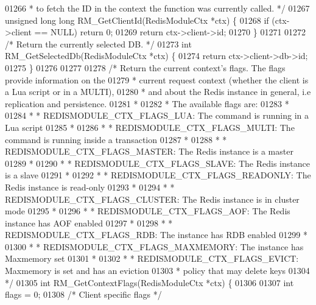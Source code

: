 \begin{DoxyCode}
{{{01266 \textcolor{comment}{ * to fetch the ID in the context the function was currently called. */}
01267 \textcolor{keywordtype}{unsigned} \textcolor{keywordtype}{long} \textcolor{keywordtype}{long} RM\_GetClientId(RedisModuleCtx *ctx) \{
01268     \textcolor{keywordflow}{if} (ctx->client == NULL) \textcolor{keywordflow}{return} 0;
01269     \textcolor{keywordflow}{return} ctx->client->id;
01270 \}
01271 
01272 \textcolor{comment}{/* Return the currently selected DB. */}
01273 \textcolor{keywordtype}{int} RM\_GetSelectedDb(RedisModuleCtx *ctx) \{
01274     \textcolor{keywordflow}{return} ctx->client->db->id;
01275 \}
01276 
01277 
01278 \textcolor{comment}{/* Return the current context's flags. The flags provide information on the }
01279 \textcolor{comment}{ * current request context (whether the client is a Lua script or in a MULTI),}
01280 \textcolor{comment}{ * and about the Redis instance in general, i.e replication and persistence. }
01281 \textcolor{comment}{ * }
01282 \textcolor{comment}{ * The available flags are:}
01283 \textcolor{comment}{ * }
01284 \textcolor{comment}{ *  * REDISMODULE\_CTX\_FLAGS\_LUA: The command is running in a Lua script}
01285 \textcolor{comment}{ * }
01286 \textcolor{comment}{ *  * REDISMODULE\_CTX\_FLAGS\_MULTI: The command is running inside a transaction}
01287 \textcolor{comment}{ * }
01288 \textcolor{comment}{ *  * REDISMODULE\_CTX\_FLAGS\_MASTER: The Redis instance is a master}
01289 \textcolor{comment}{ * }
01290 \textcolor{comment}{ *  * REDISMODULE\_CTX\_FLAGS\_SLAVE: The Redis instance is a slave}
01291 \textcolor{comment}{ * }
01292 \textcolor{comment}{ *  * REDISMODULE\_CTX\_FLAGS\_READONLY: The Redis instance is read-only}
01293 \textcolor{comment}{ * }
01294 \textcolor{comment}{ *  * REDISMODULE\_CTX\_FLAGS\_CLUSTER: The Redis instance is in cluster mode}
01295 \textcolor{comment}{ * }
01296 \textcolor{comment}{ *  * REDISMODULE\_CTX\_FLAGS\_AOF: The Redis instance has AOF enabled}
01297 \textcolor{comment}{ * }
01298 \textcolor{comment}{ *  * REDISMODULE\_CTX\_FLAGS\_RDB: The instance has RDB enabled}
01299 \textcolor{comment}{ * }
01300 \textcolor{comment}{ *  * REDISMODULE\_CTX\_FLAGS\_MAXMEMORY:  The instance has Maxmemory set}
01301 \textcolor{comment}{ * }
01302 \textcolor{comment}{ *  * REDISMODULE\_CTX\_FLAGS\_EVICT:  Maxmemory is set and has an eviction}
01303 \textcolor{comment}{ *    policy that may delete keys}
01304 \textcolor{comment}{ */}
01305 \textcolor{keywordtype}{int} RM\_GetContextFlags(RedisModuleCtx *ctx) \{
01306 
01307     \textcolor{keywordtype}{int} flags = 0;
01308     \textcolor{comment}{/* Client specific flags */}
}}}
\end{DoxyCode}
